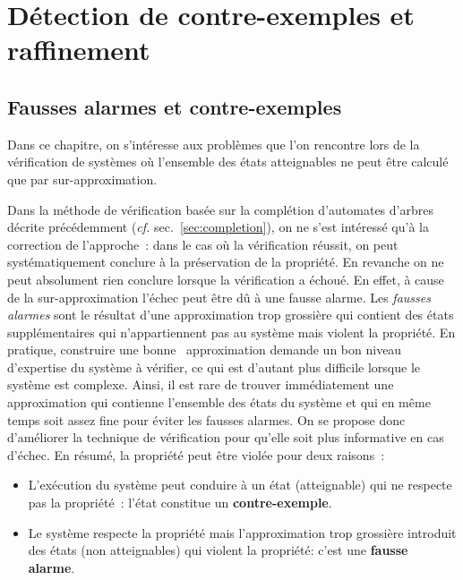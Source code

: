 \chapter{Détection de contre-exemples et raffinement}
\section{Fausses alarmes et contre-exemples}


Dans ce chapitre, on s'intéresse aux problèmes que l'on rencontre lors de la vérification de systèmes
où l'ensemble des états atteignables ne peut être calculé que par sur-approximation.

Dans la méthode de vérification basée sur la complétion d'automates d'arbres décrite précédemment
(\textit{cf.} sec.~\ref{sec:completion}), on ne s'est intéressé qu'à la correction de l'approche~:
dans le cas où la vérification réussit, on peut systématiquement  conclure à la préservation
de la propriété. En revanche on ne peut absolument rien conclure lorsque la vérification a échoué.
En effet, à cause de la sur-approximation l'échec peut être dû à une fausse alarme. Les \emph{fausses alarmes} sont
le résultat d'une approximation trop grossière qui contient des états supplémentaires qui n'appartiennent pas au 
système mais violent la propriété. %
En pratique, construire une \og bonne \fg\ approximation demande un bon niveau d'expertise du système à vérifier, 
ce qui est d'autant plus difficile lorsque le système est complexe. 
Ainsi, il est rare de trouver immédiatement une approximation qui contienne l'ensemble des états du système et qui en
même temps soit assez fine pour éviter les fausses alarmes. On se propose donc d'améliorer la technique de vérification
pour qu'elle soit plus informative en cas d'échec. En résumé, la propriété peut être violée pour deux raisons~:\\

\begin{itemize}
\item L'exécution du système peut conduire à un état (atteignable) qui ne
  respecte pas la propriété~: l'état constitue un \textbf{contre-exemple}.
  
\item Le système respecte la propriété mais l'approximation trop
  grossière introduit des états (non atteignables) qui violent la
  propriété: c'est une \textbf{fausse alarme}.\\
\end{itemize}



